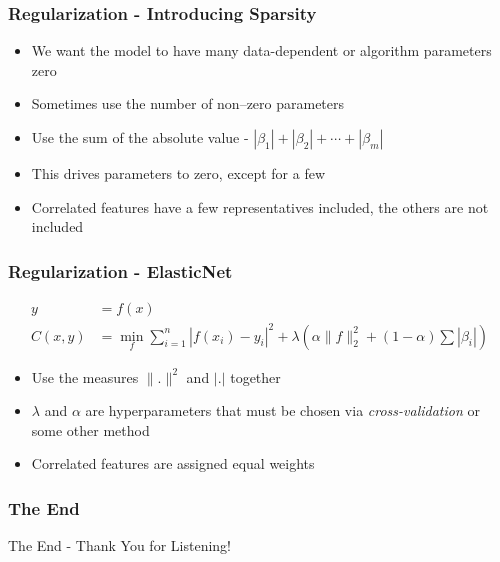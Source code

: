\documentclass{beamer}
\begin{document}
\begin{frame}
\frametitle{Regularization - Introducing Sparsity}
\begin{itemize}
\item We want the model to have many data-dependent or algorithm parameters zero
\item Sometimes use the number of non--zero parameters
\item Use the sum of the absolute value - $| \beta_1 | + | \beta_2 | + \cdots + | \beta_m |$
\item This drives parameters to zero, except for a few
\item Correlated features have a few representatives included, the others are not included
\end{itemize}
\end{frame}

\begin{frame}
\frametitle{Regularization - ElasticNet}
\begin{align}
y &= f(x) \\
C(x, y) &= \min_f \sum_{i=1}^{n} \left| f(x_i) - y_i \right|^2 + \lambda \left( \alpha \| f \|_2^2 + (1 - \alpha) \sum \left| \beta_i \right| \right)
\end{align}
\begin{itemize}
\item Use the measures $\|. \|^2$ and $|.|$ together
\item $\lambda$ and $\alpha$ are hyperparameters that must be chosen via \textit{cross-validation} or some other method
\item Correlated features are assigned equal weights
\end{itemize}
\end{frame}


\begin{frame}
\frametitle{The End}
\Huge{\centerline{The End - Thank You for Listening!}}
\end{frame}

\end{document}
